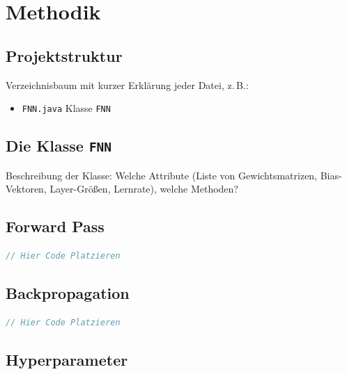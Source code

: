 \section{Methodik}
\label{sec:Methodik}

\subsection{Projektstruktur}

\begin{hinweisbox}[Platzhalter]
Verzeichnisbaum mit kurzer Erklärung jeder Datei, z.\,B.:
\begin{itemize}
    \item \texttt{FNN.java} Klasse \texttt{FNN}
\end{itemize}
\end{hinweisbox}

\subsection{Die Klasse \texttt{FNN}}

\begin{hinweisbox}[Platzhalter]
Beschreibung der Klasse: Welche Attribute (Liste von Gewichtsmatrizen, Bias-Vektoren, Layer-Größen, Lernrate), welche Methoden?
\end{hinweisbox}

\subsection{Forward Pass}

\begin{lstlisting}[language=Java, caption={Forward Pass in Java (schematisch)}, label={lst:forward}]
// Hier Code Platzieren
\end{lstlisting}

\subsection{Backpropagation}

\begin{lstlisting}[language=Java, caption={Backpropagation (schematisch)}, label={lst:backprop}]
// Hier Code Platzieren
\end{lstlisting}

\subsection{Hyperparameter}

